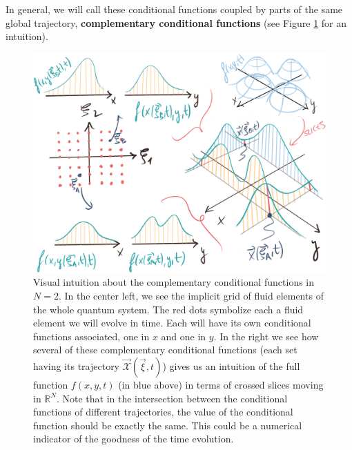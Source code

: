 \documentclass[11pt, a4paper]{article} %
\newcommand{\R}{\mathbb{R}} %
\newcommand{\x}{\mathcal{X}}
\begin{document}
In general, we will call these conditional functions coupled by parts of the same global trajectory, {\bf complementary conditional functions} (see Figure \ref{fig:complementary} for an intuition).
\vspace{0.3cm}

\begin{figure}[h!]
  \centering
    \includegraphics[width=0.75\linewidth]{7slices_complementary.png}
  \caption{ Visual intuition about the complementary conditional functions in $N=2$. In the center left, we see the implicit grid of fluid elements of the whole quantum system. The red dots symbolize each a fluid element we will evolve in time. Each will have its own conditional functions associated, one in $x$ and one in $y$. In the right we see how several of these complementary conditional functions (each set having its trajectory $\vec{\x}(\vec{\xi},t)$) gives us an intuition of the full function $f(x,y,t)$ (in blue above) in terms of crossed slices moving in $\R^N$. Note that in the intersection between the conditional functions of different trajectories, the value of the conditional function should be exactly the same. This could be a numerical indicator of the goodness of the time evolution. }
  \label{fig:complementary}
\end{figure}
\end{document}
